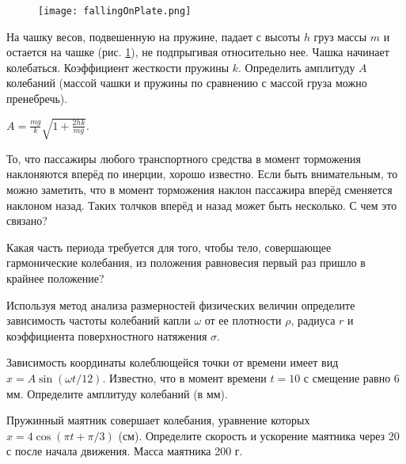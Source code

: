 \begin{figure}[h]
\centering
\texttt{[image: fallingOnPlate.png]}
\caption{}
\label{fallingOnPlate}
\end{figure}

\begin{ex} %
На чашку весов, подвешенную на пружине, падает с высоты $h$ груз массы $m$ и остается на чашке (рис. \ref{fallingOnPlate}), не подпрыгивая относительно нее. Чашка начинает колебаться. Коэффициент жесткости пружины $k$. Определить амплитуду $A$ колебаний (массой чашки и пружины по сравнению с массой груза можно пренебречь).
\begin{ans}
$A = \frac{mg}{k}\sqrt{ 1 + \frac{2hk}{mg}}$.
\end{ans}
\end{ex}	

\qualProblems

\begin{ex}
То, что пассажиры любого транспортного средства в момент торможения наклоняются вперёд по инерции, хорошо известно. Если быть внимательным, то можно заметить, что в момент торможения наклон пассажира вперёд сменяется наклоном назад. Таких толчков вперёд и назад может быть несколько. С чем это связано?
\end{ex}	

\begin{ex}
Какая часть периода требуется для того, чтобы тело, совершающее гармонические колебания, из положения равновесия первый раз пришло в крайнее положение?
\end{ex}	

\begin{ex}
Используя метод анализа размерностей физических величин определите зависимость частоты колебаний капли $\omega$ от ее плотности $\rho$, радиуса $r$ и коэффициента поверхностного натяжения $\sigma$.
\end{ex}	

\simpleProblems

\begin{ex}
Зависимость координаты колеблющейся точки от времени имеет вид $x = A\sin(\omega t/12)$. Известно, что в момент времени $t = 10$ с смещение равно 6 мм. Определите амплитуду колебаний (в мм).
\end{ex}	

\begin{ex}
Пружинный маятник совершает колебания, уравнение которых $x = 4\cos(\pi t + \pi/3)$ (см). Определите скорость и ускорение маятника через 20 с после начала движения. Масса маятника 200 г.
\end{ex}	

